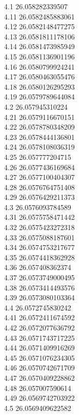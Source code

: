 {4.1	26.058282339507\\
4.11	26.0582485883061\\
4.12	26.0582148477275\\
4.13	26.0581811178106\\
4.14	26.0581473985949\\
4.15	26.0581136901196\\
4.16	26.0580799924241\\
4.17	26.0580463055476\\
4.18	26.0580126295293\\
4.19	26.0579789644084\\
4.2	26.057945310224\\
4.21	26.0579116670151\\
4.22	26.0578780348209\\
4.23	26.0578444136801\\
4.24	26.0578108036319\\
4.25	26.057777204715\\
4.26	26.0577436169684\\
4.27	26.0577100404307\\
4.28	26.0576764751408\\
4.29	26.0576429211373\\
4.3	26.0576093784589\\
4.31	26.0575758471442\\
4.32	26.0575423272318\\
4.33	26.0575088187601\\
4.34	26.0574753217677\\
4.35	26.0574418362928\\
4.36	26.057408362374\\
4.37	26.0573749000495\\
4.38	26.0573414493576\\
4.39	26.0573080103364\\
4.4	26.0572745830242\\
4.41	26.0572411674592\\
4.42	26.0572077636792\\
4.43	26.0571743717225\\
4.44	26.0571409916269\\
4.45	26.0571076234305\\
4.46	26.0570742671709\\
4.47	26.0570409228862\\
4.48	26.057007590614\\
4.49	26.0569742703922\\
4.5	26.0569409622582\\
}
